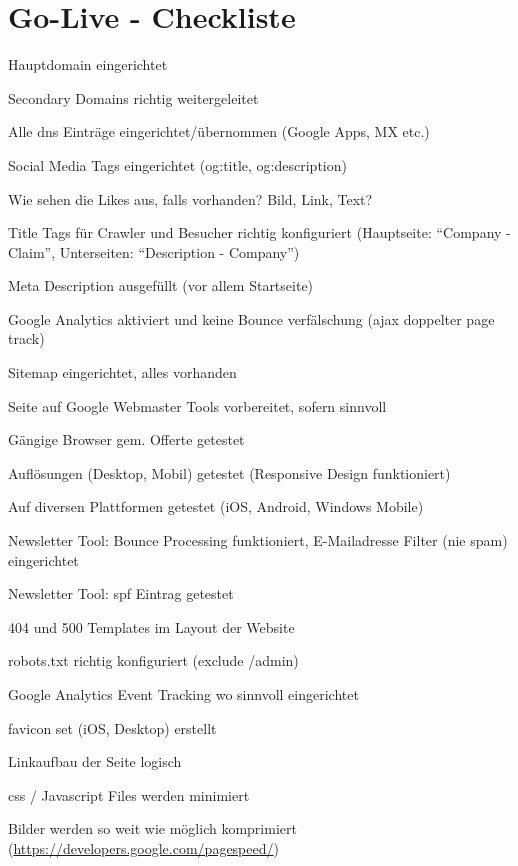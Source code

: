 
\section{Go-Live - Checkliste}
\label{sec:appendix_go_live_checkliste}
\begin{checklist}
  \item Hauptdomain eingerichtet
  \item Secondary Domains richtig weitergeleitet
  \item Alle \acrshort{dns} Einträge eingerichtet/übernommen (Google Apps, MX etc.)
  \item Social Media Tags eingerichtet (og:title, og:description)
  \item Wie sehen die Likes aus, falls vorhanden? Bild, Link, Text?
  \item Title Tags für Crawler und Besucher richtig konfiguriert (Hauptseite: ``Company - Claim'', Unterseiten: ``Description - Company'')
  \item Meta Description ausgefüllt (vor allem Startseite)
  \item Google Analytics aktiviert und keine Bounce verfälschung (\acrshort{ajax} doppelter page track)
  \item Sitemap eingerichtet, alles vorhanden
  \item Seite auf Google Webmaster Tools vorbereitet, sofern sinnvoll
  \item Gängige Browser gem. Offerte getestet
  \item Auflösungen (Desktop, Mobil) getestet (Responsive Design funktioniert)
  \item Auf diversen Plattformen getestet (iOS, Android, Windows Mobile)
  \item Newsletter Tool: Bounce Processing funktioniert, E-Mailadresse Filter (nie spam) eingerichtet
  \item Newsletter Tool: \gls{spf} Eintrag getestet
  \item 404 und 500 Templates im Layout der Website
  \item robots.txt richtig konfiguriert (exclude /admin)
  \item Google Analytics Event Tracking wo sinnvoll eingerichtet
  \item favicon set (iOS, Desktop) erstellt
  \item Linkaufbau der Seite logisch
  \item \acrshort{css} / Javascript Files werden minimiert
  \item Bilder werden so weit wie möglich komprimiert (\url{https://developers.google.com/pagespeed/})

\end{checklist}

